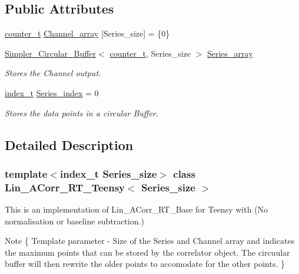\subsection*{Public Attributes}
\begin{DoxyCompactItemize}
\item 
\hyperlink{types_8hpp_a22f279793847eba127de149437848c48}{counter\+\_\+t} \hyperlink{classLin__ACorr__RT__Teensy_af4dda93e07198bae54553a8f11773e74}{Channel\+\_\+array} \mbox{[}Series\+\_\+size\mbox{]} = \{0\}
\item 
\hyperlink{classSimpler__Circular__Buffer}{Simpler\+\_\+\+Circular\+\_\+\+Buffer}$<$ \hyperlink{types_8hpp_a22f279793847eba127de149437848c48}{counter\+\_\+t}, Series\+\_\+size $>$ \hyperlink{classLin__ACorr__RT__Teensy_a9a619d1a74076f0bac8b7f03acebbb75}{Series\+\_\+array}
\begin{DoxyCompactList}\small\item\em Stores the Channel output. \end{DoxyCompactList}\item 
\hyperlink{types_8hpp_a7c40bb931c31595ed6308605f4537447}{index\+\_\+t} \hyperlink{classLin__ACorr__RT__Teensy_a495539383a4cab5ff611545361600599}{Series\+\_\+index} = 0
\begin{DoxyCompactList}\small\item\em Stores the data points in a circular Buffer. \end{DoxyCompactList}\end{DoxyCompactItemize}


\subsection{Detailed Description}
\subsubsection*{template$<$index\+\_\+t Series\+\_\+size$>$\newline
class Lin\+\_\+\+A\+Corr\+\_\+\+R\+T\+\_\+\+Teensy$<$ Series\+\_\+size $>$}

This is an implementation of Lin\+\_\+\+A\+Corr\+\_\+\+R\+T\+\_\+\+Base for Teensy with {\bfseries }(No normalisation or baseline subtraction.) 

\begin{DoxyNote}{Note}
\{ Template parameter -\/ Size of the Series and Channel array and indicates the maximum points that can be stored by the correlator object. The circuular buffer will then rewrite the older points to accomodate for the other points. \} 
\end{DoxyNote}


